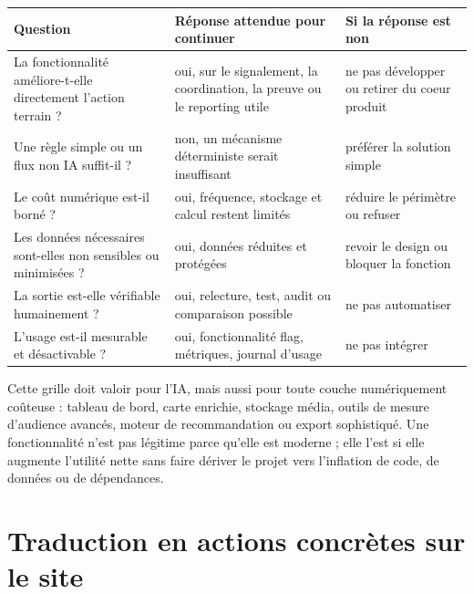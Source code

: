 \documentclass[
  10pt,
  a4paper,
  DIV=11,
  numbers=noendperiod,
  oneside]{scrreprt}
\newcounter{none} %
\begin{document}
{\def\LTcaptype{none} %
\begin{longtable}[]{@{}
  >{\raggedright\arraybackslash}p{}
  >{\raggedright\arraybackslash}p{}
  >{\raggedright\arraybackslash}p{}@{}}
\toprule\noalign{}
\begin{minipage}[b]{\linewidth}\raggedright
Question
\end{minipage} & \begin{minipage}[b]{\linewidth}\raggedright
Réponse attendue pour continuer
\end{minipage} & \begin{minipage}[b]{\linewidth}\raggedright
Si la réponse est non
\end{minipage} \\
\midrule\noalign{}
\endhead
\bottomrule\noalign{}
\endlastfoot
La fonctionnalité améliore-t-elle directement l'action terrain ? & oui,
sur le signalement, la coordination, la preuve ou le reporting utile &
ne pas développer ou retirer du coeur produit \\
Une règle simple ou un flux non IA suffit-il ? & non, un mécanisme
déterministe serait insuffisant & préférer la solution simple \\
Le coût numérique est-il borné ? & oui, fréquence, stockage et calcul
restent limités & réduire le périmètre ou refuser \\
Les données nécessaires sont-elles non sensibles ou minimisées ? & oui,
données réduites et protégées & revoir le design ou bloquer la
fonction \\
La sortie est-elle vérifiable humainement ? & oui, relecture, test,
audit ou comparaison possible & ne pas automatiser \\
L'usage est-il mesurable et désactivable ? & oui, fonctionnalité flag,
métriques, journal d'usage & ne pas intégrer \\
\end{longtable}
}

Cette grille doit valoir pour l'IA, mais aussi pour toute couche
numériquement coûteuse : tableau de bord, carte enrichie, stockage
média, outils de mesure d'audience avancés, moteur de recommandation ou
export sophistiqué. Une fonctionnalité n'est pas légitime parce qu'elle
est moderne ; elle l'est si elle augmente l'utilité nette sans faire
dériver le projet vers l'inflation de code, de données ou de
dépendances.

\section{Traduction en actions concrètes sur le
site}\label{traduction-en-actions-concruxe8tes-sur-le-site}
\end{document}

